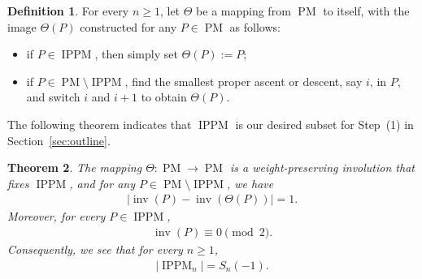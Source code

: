 \documentclass[12pt,reqno]{amsart}
\numberwithin{equation}{section}
\theoremstyle{theorem}
\newtheorem{theorem}{Theorem}[section]
\theoremstyle{definition}
\newtheorem{definition}[theorem]{Definition}
\theoremstyle{named}
\newcommand{\MatP}{\operatorname{PM}}
\newcommand{\inv}{\operatorname{inv}}
\newcommand{\IPPM}{\operatorname{IPPM}}
\begin{document}
\begin{definition}\label{def:Theta}
	For every $n\ge 1$, let $\Theta$ be a mapping from $\MatP$ to itself, with the image $\Theta(P)$ constructed for any $P\in\MatP$ as follows:
	\begin{itemize}[itemindent=*, leftmargin=*, itemsep=2pt, topsep=2pt, parsep=2pt]
		\item if $P\in\IPPM$, then simply set $\Theta(P):=P$;
		\item if $P\in \MatP\setminus\IPPM$, find the smallest proper ascent or descent, say $i$, in $P$, and switch $i$ and $i+1$ to obtain $\Theta(P)$.
	\end{itemize}
\end{definition}

The following theorem indicates that $\IPPM$ is our desired subset for Step~(1) in Section~\ref{sec:outline}.

\begin{theorem}\label{thm:MIP=S(-1)}
	The mapping $\Theta: \MatP\to \MatP$ is a weight-preserving involution that fixes $\IPPM$, and for any $P\in\MatP\setminus\IPPM$, we have
	\begin{align}\label{Theta-sign}
		|\inv(P)-\inv(\Theta(P))|=1.
	\end{align}
	Moreover, for every $P\in\IPPM$,
	\begin{align}\label{MIP-pos}
		\inv(P)\equiv 0\pmod 2.
	\end{align} Consequently, we see that for every $n\ge 1$,
	\begin{align}\label{eq:S-1-MIP}
		|\IPPM_{n}|=S_n(-1).
	\end{align}
\end{theorem}
\end{document}
